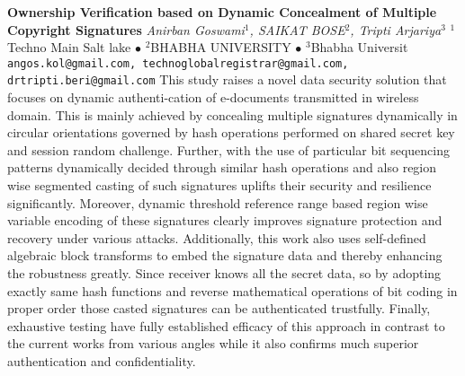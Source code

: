 
    \begin{conf-abstract}[]
        {\textbf{Ownership Verification based on Dynamic Concealment of Multiple Copyright Signatures }}
        {\textit{Anirban Goswami$^{1}$, SAIKAT BOSE$^{2}$, Tripti Arjariya$^{3}$}}
        {$^{1}$Techno Main Salt lake $\bullet$ $^{2}$BHABHA UNIVERSITY $\bullet$ $^{3}$Bhabha Universit}
        {\texttt{angos.kol@gmail.com, technoglobalregistrar@gmail.com, drtripti.beri@gmail.com}}
        {This study raises a novel data security solution that focuses on dynamic authenti-cation of e-documents transmitted in wireless domain. This is mainly achieved by concealing multiple signatures dynamically in circular orientations governed by hash operations performed on shared secret key and session random challenge. Further, with the use of particular bit sequencing patterns dynamically decided through similar hash operations and also region wise segmented casting of such signatures uplifts their security and resilience significantly. Moreover, dynamic threshold reference range based region wise variable encoding of these signatures clearly improves signature protection and recovery under various attacks. Additionally, this work also uses self-defined algebraic block transforms to embed the signature data and thereby enhancing the robustness greatly. Since receiver knows all the secret data, so by adopting exactly same hash functions and reverse mathematical operations of bit coding in proper order those casted signatures can be authenticated trustfully. Finally, exhaustive testing have fully established efficacy of this approach in contrast to the current works from various angles while it also confirms much superior authentication and confidentiality.}
    \end{conf-abstract}
        